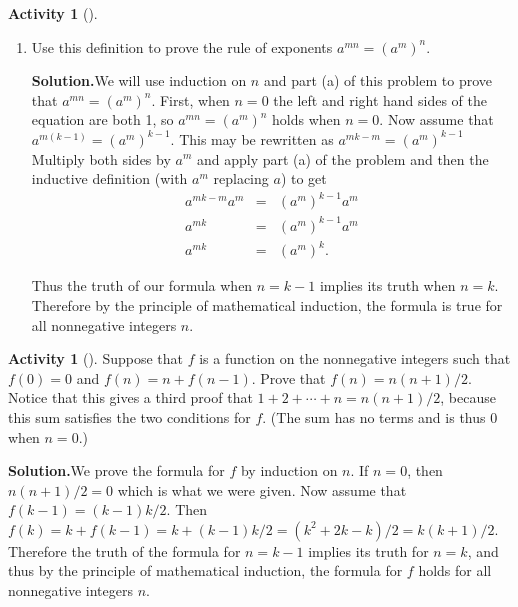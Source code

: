 \documentclass[10pt,]{book}
\theoremstyle{plain}
\theoremstyle{definition}
\newtheorem{activity}[project]{Activity}
\numberwithin{equation}{chapter}
\newcommand{\amp}{&}
\begin{document}
\begin{activity}[]
\begin{enumerate}[label=(\alph*)]
~\par
\item Use this definition to prove the rule of exponents \(a^{mn} =
(a^m)^n\).%
\par\medskip\noindent%
\textbf{Solution.}\quad We will use induction on \(n\) and part (a) of this problem to prove that \(a^{mn}=(a^m)^n\). First, when \(n=0\) the left and right hand sides of the equation are both 1, so \(a^{mn}=(a^m)^n\) holds when \(n=0\). Now assume that \(a^{m(k-1)} =(a^m)^{k-1}\). This may be rewritten as \(a^{mk-m}=(a^m)^{k-1}\) Multiply both sides by \(a^m\) and apply part (a) of the problem and then the inductive definition (with \(a^m\) replacing \(a\)) to get%
\begin{align*}
a^{mk-m}a^m\amp =\amp (a^m)^{k-1}a^m\\
a^{mk}\amp =\amp (a^m)^{k-1}a^m\\
a^{mk}\amp =\amp (a^m)^k.
\end{align*}
%
\par
Thus the truth of our formula when \(n=k-1\) implies its truth when \(n=k\). Therefore by the principle of mathematical induction, the formula is true for all nonnegative integers \(n\).%

\end{enumerate}
\end{activity}
\begin{activity}[]\label{activity-28}
Suppose that \(f\) is a function on the nonnegative integers such that \(f(0)=0\) and \(f(n) = n+f(n-1)\). Prove that \(f(n) = n(n+1)/2\). Notice that this gives a third proof that \(1+2+\cdots+n=n(n+1)/2\), because this sum satisfies the two conditions for \(f\). (The sum has no terms and is thus 0 when \(n=0\).)%
\par\medskip\noindent%
\textbf{Solution.}\quad We prove the formula for \(f\) by induction on \(n\). If \(n=0\), then \(n(n+1)/2=0\) which is what we were given. Now assume that \(f(k-1)=
(k-1)k/2\). Then \(f(k)= k+f(k-1)= k+(k-1)k/2=(k^2+2k-k)/2=k(k+1)/2\). Therefore the truth of the formula for \(n=k-1\) implies its truth for \(n=k\), and thus by the principle of mathematical induction, the formula for \(f\) holds for all nonnegative integers \(n\).%
\end{activity}
\end{document}
